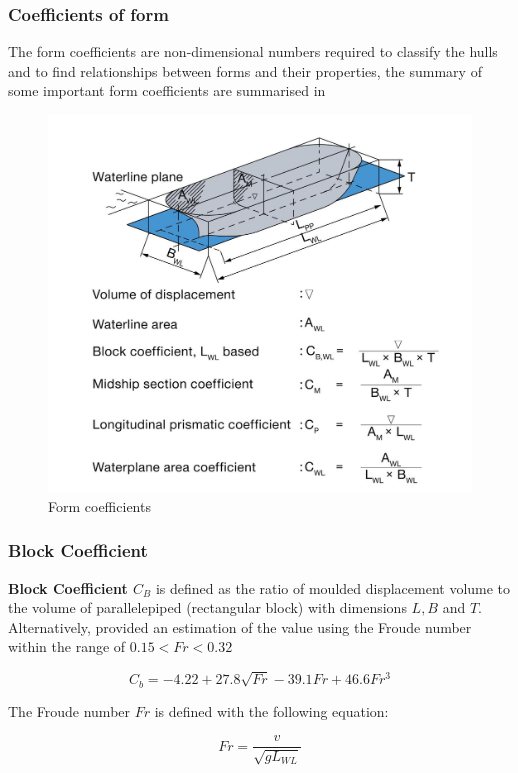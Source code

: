 \subsubsection*{Coefficients of form}

The form coefficients are non-dimensional numbers required to classify the hulls and to find relationships between forms and their properties, the summary of some important form coefficients are summarised in  

\begin{figure}[ht]
    \centering
        \includegraphics[width=.6\textwidth]{02_figures/man11_shipcoeff.jpg}
        \caption{Form coefficients }
        \label{fig:man_formcoeff}
\end{figure}

\subsubsection*{Block Coefficient}
\textbf{Block Coefficient $C_B$} is defined as the ratio of moulded displacement volume to the volume of parallelepiped (rectangular block) with dimensions $L,B$ and $T$. Alternatively,  provided an estimation of the value using the Froude number within the range of $0.15 < Fr < 0.32$

\begin{equation}
    \label{eqn:Cb_Schneekluth}
    C_b = -4.22 + 27.8\sqrt{Fr} - 39.1Fr + 46.6Fr^3
\end{equation}

The Froude number $Fr$ is defined with the following equation:

\begin{equation}
    \label{eqn:Froude_Number}
    Fr = \frac{v}{\sqrt{gL_{WL}}}
\end{equation}

